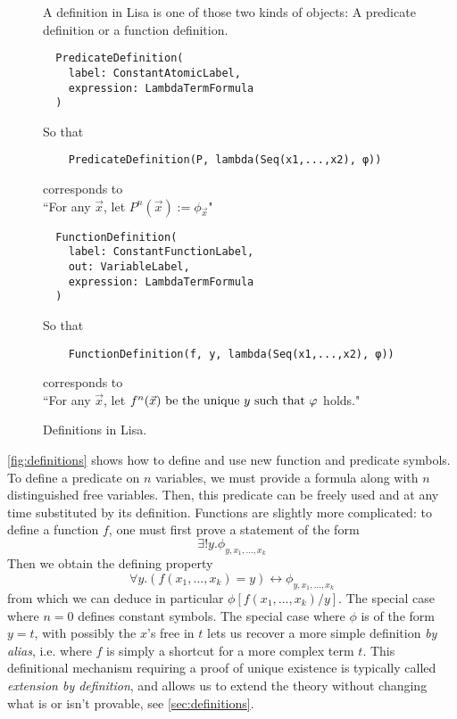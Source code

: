 \begin{figure}
  A definition in Lisa is one of those two kinds of objects: A predicate definition or a function definition.
  \begin{lstlisting}
  PredicateDefinition(
    label: ConstantAtomicLabel,
    expression: LambdaTermFormula
  )
\end{lstlisting}
  So that
  \begin{lstlisting}
    PredicateDefinition(P, lambda(Seq(x1,...,x2), φ)) 
  \end{lstlisting}
  corresponds to \\
  \hspace*{1.3em}``For any $\vec{x}$, let $P^n(\vec{x}) := \phi_{\vec{x}}$"

  \vspace*{2em}
  \begin{lstlisting}
  FunctionDefinition(
    label: ConstantFunctionLabel,
    out: VariableLabel, 
    expression: LambdaTermFormula
  )
\end{lstlisting}
  So that
  \begin{lstlisting}
    FunctionDefinition(f, y, lambda(Seq(x1,...,x2), φ)) 
  \end{lstlisting}
  corresponds to \\
  \hspace*{1.3em}``For any $\vec{x}$, let $f^n(\vec{x}) \textnormal{ be the unique } y \textnormal{ such that } \varphi$ holds."

  \caption{Definitions in Lisa.}
  \label{fig:definitions}
\end{figure}

\autoref{fig:definitions} shows how to define and use new function and predicate symbols. To define a predicate on $n$ variables, we must provide a formula along with $n$ distinguished free variables. Then, this predicate can be freely used and at any time substituted by its definition. Functions are slightly more complicated: to define a function $f$, one must first prove a statement of the form
$$\exists ! y. \phi_{y, x_1,...,x_k}$$
Then we obtain the defining property
$$\forall y. (f(x_1,...,x_k)=y) \leftrightarrow \phi_{y, x_1,...,x_k}$$
from which we can deduce in particular $\phi[f(x_1,...,x_k)/y]$.
The special case where $n=0$ defines constant symbols. The special case where $\phi$ is of the form $y=t$, with possibly the $x$'s free in $t$ lets us recover a more simple definition \textit{by alias}, i.e. where  $f$ is simply a shortcut for a more complex term $t$.
This definitional mechanism requiring a proof of unique existence is typically called \textit{extension by definition}, and allows us to extend the theory without changing what is or isn't provable, see \autoref{sec:definitions}.

